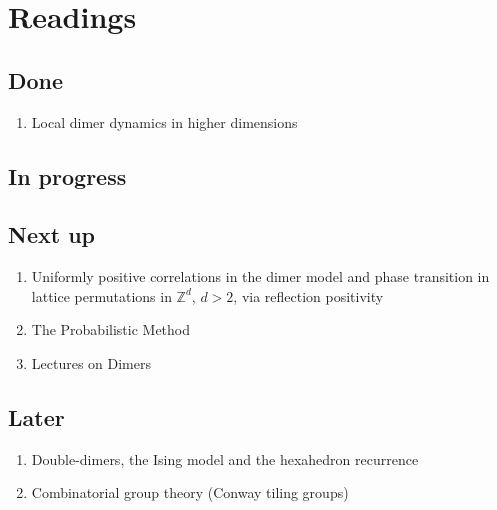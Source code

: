 \chapter{Readings}

\section{Done}
\begin{enumerate}
	\item Local dimer dynamics in higher dimensions \cite{hartarsky2023local}
\end{enumerate}

\section{In progress}

\section{Next up}
\begin{enumerate}
	\item Uniformly positive correlations in the dimer model and phase transition in lattice permutations in $\mathbb{Z}^d$, $d > 2$, via reflection positivity \cite{taggi2019uniformly}
	\item The Probabilistic Method \cite{alonprobabilistic}
	\item Lectures on Dimers \cite{kenyon2009lectures}
\end{enumerate}

\section{Later}
\begin{enumerate}
	\item Double-dimers, the Ising model and the hexahedron recurrence \cite{kenyon2013double}
	\item Combinatorial group theory (Conway tiling groups)
\end{enumerate}